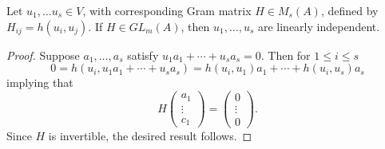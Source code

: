 \begin{lemma}\label{lemma2.4}
Let $u_1, \dotsc u_s \in V$, with corresponding Gram matrix $H \in M_s(A)$, defined by $H_{ij} = h(u_i, u_j)$.
If $H \in GL_m(A)$, then $u_1, \dotsc, u_s$ are linearly independent.
\end{lemma}
\begin{proof}
Suppose $a_1, \dotsc, a_s$ satisfy $u_1 a_1 + \dotsb + u_sa_s = 0$.
Then for $1 \le i \le s$
\[
0 = h(u_i, u_1 a_1 + \dotsb + u_s a_s) = h(u_i, u_1)a_1 + \dotsb + h(u_i, u_s)a_s
\]
implying that 
\[
H \left( \begin{array}{c}
a_1 \\
\vdots \\
c_1
\end{array} \right)
= \left( \begin{array}{c}
0 \\
\vdots \\
0
\end{array}
\right).
\]
Since $H$ is invertible, the desired result follows.
\end{proof}
